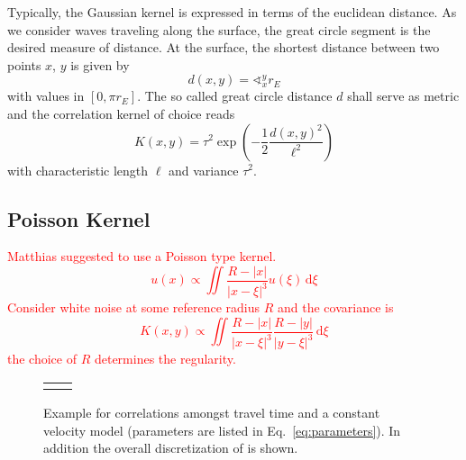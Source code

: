 \documentclass[11pt]{article}
\newcommand\worries[1]{\textcolor{red}{#1}}
\begin{document}
Typically, the Gaussian kernel is expressed in terms of the euclidean distance.
As we consider waves traveling along the surface, the great circle segment is the desired measure of distance.
At the surface, the shortest distance between two points $x$, $y$ is given by
\begin{equation}
    d(x,y) = \sphericalangle_x^y r_E
\end{equation}
with values in $[0, \pi r_E]$.
The so called great circle distance $d$ shall serve as metric and the correlation kernel of choice reads
\begin{equation}
    K(x,y) = \tau^2 \exp\!\left(-\frac 12 \frac{d(x,y)^2}{\ell^2}\right)
\end{equation}
with characteristic length $\ell$ and variance $\tau^2$.

\subsection{Poisson Kernel}
\worries{Matthias suggested to use a Poisson type kernel.
\begin{equation}
    u(x) \propto \iint \frac{R-|x|}{|x-\xi|^3} u(\xi) \, \mathrm d \xi
\end{equation}
Consider white noise at some reference radius $R$ and the covariance is
\begin{equation}
    K(x,y) \propto \iint \frac{R-|x|}{|x-\xi|^3} \frac{R-|y|}{|y-\xi|^3} \, \mathrm d \xi
\end{equation}
the choice of $R$ determines the regularity. }

\begin{figure}
    \centering
    \begin{tabular}{p{}p{}}
    \vspace{0pt}  &
    \vspace{0pt} 
    \end{tabular}
    \caption{Example for correlations amongst travel time and a constant velocity model (parameters are listed in Eq.~\ref{eq:parameters}).
        In addition the overall discretization of is shown. }
    \label{fig:correlation}
\end{figure}
\end{document}
